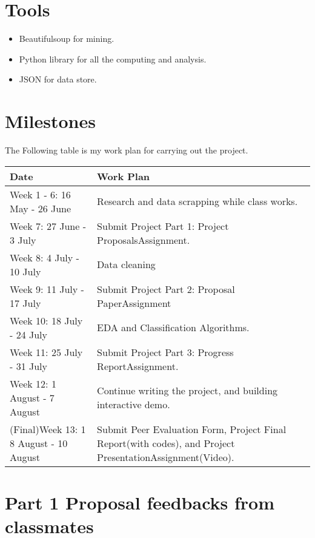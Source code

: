 \section{Tools}
\begin{itemize}
	\item Beautifulsoup for mining.
	\item Python library for all the computing and analysis.
	\item JSON for data store.
\end{itemize}
\section{Milestones}
The Following table is my work plan for carrying out the project.
\begin{center}
	\begin{tabular}{ | p{3cm} |p{3.5cm} |}
		\hline
		Date & Work Plan \\ \hline
		Week 1 - 6: 16 May - 26 June& Research and data scrapping while class works.\\\hline
		Week 7: 27 June - 3 July & Submit Project Part 1: Project ProposalsAssignment.\\\hline
		Week 8: 4 July - 10 July & Data cleaning\\\hline
		Week 9: 11 July - 17 July & Submit Project Part 2: Proposal PaperAssignment\\\hline
		Week 10: 18 July - 24 July & EDA and Classification Algorithms.\\\hline
		Week 11: 25 July - 31 July & Submit Project Part 3: Progress ReportAssignment.\\\hline
			Week 12: 1 August - 7 August & Continue writing the project, and building interactive demo.\\\hline
				(Final)Week 13: 1 8 August - 10 August & Submit Peer Evaluation Form, Project Final Report(with codes), and Project PresentationAssignment(Video).\\\hline
	\end{tabular}
\end{center}


\section{Part 1 Proposal feedbacks from classmates}
